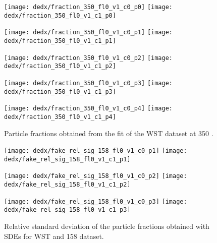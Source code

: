 \begin{figure}
  \centering
  \texttt{[image: dedx/fraction\_350\_fl0\_v1\_c0\_p0]}
  \texttt{[image: dedx/fraction\_350\_fl0\_v1\_c1\_p0]}

  \texttt{[image: dedx/fraction\_350\_fl0\_v1\_c0\_p1]}
  \texttt{[image: dedx/fraction\_350\_fl0\_v1\_c1\_p1]}

  \texttt{[image: dedx/fraction\_350\_fl0\_v1\_c0\_p2]}
  \texttt{[image: dedx/fraction\_350\_fl0\_v1\_c1\_p2]}


  \texttt{[image: dedx/fraction\_350\_fl0\_v1\_c0\_p3]}
  \texttt{[image: dedx/fraction\_350\_fl0\_v1\_c1\_p3]}

  \texttt{[image: dedx/fraction\_350\_fl0\_v1\_c0\_p4]}
  \texttt{[image: dedx/fraction\_350\_fl0\_v1\_c1\_p4]}

  \caption{Particle fractions obtained from the fit of the WST dataset at 350 \GeVc.}
  \label{fig:hadron:dedx:fit:frac350w}
\end{figure}

\clearpage



\begin{figure}
  \centering
  \texttt{[image: dedx/fake\_rel\_sig\_158\_fl0\_v1\_c0\_p1]}
  \texttt{[image: dedx/fake\_rel\_sig\_158\_fl0\_v1\_c1\_p1]}

  \texttt{[image: dedx/fake\_rel\_sig\_158\_fl0\_v1\_c0\_p2]}
  \texttt{[image: dedx/fake\_rel\_sig\_158\_fl0\_v1\_c1\_p2]}

  \texttt{[image: dedx/fake\_rel\_sig\_158\_fl0\_v1\_c0\_p3]}
  \texttt{[image: dedx/fake\_rel\_sig\_158\_fl0\_v1\_c1\_p3]}

  \caption{Relative standard deviation of the particle fractions obtained with SDEs for WST and 158 \GeVc dataset.}
  \label{fig:hadron:dedx:fit:fake:relsig158w}
\end{figure}



